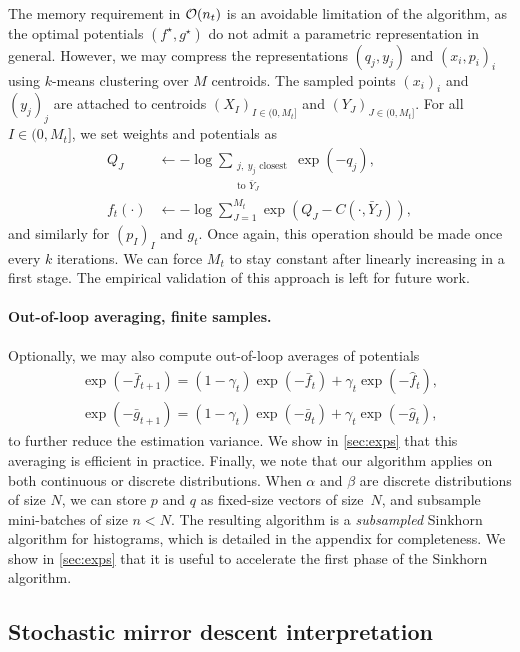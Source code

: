 The memory requirement in $\mathcal{O}(n_t)$ is an
avoidable limitation of the algorithm, as the optimal
potentials $(f^\star, g^\star)$ do not admit a parametric representation in
general. However, we may compress the representations $(q_j, y_j)$ and $(x_i,
p_i)_i$ using $k$-means clustering over $M$ centroids. The
sampled points $(x_i)_i$ and $(y_j)_j$ are attached to centroids ${(X_I)}_{I \in
(0,M_t]}$ and ${(Y_J)}_{J \in (0,M_t]}$. For all $I \in (0, M_t]$, we set
weights and potentials as
\begin{align}
    Q_J &\gets - \log \sum_{\substack{j,\:y_j \text{ closest}\\\text{to } \bar Y_J}}
     \exp(-q_j),\\
    f_t(\cdot) &\gets - \log\sum_{J=1}^{M_t} \exp(Q_J - C(\cdot, \bar Y_J)),
\end{align}
and similarly for $(p_I)_I$ and $g_t$. Once again, this operation should be made
once every $k$ iterations. We can force $M_t$ to stay constant after linearly increasing in a first stage. The empirical validation of this approach is left for future work.

\paragraph{Out-of-loop averaging, finite samples.} Optionally, we may also
compute out-of-loop averages of potentials
\begin{align}
    \exp(-\bar f_{t+1}) = (1 - \gamma_t) \exp(-\bar f_t) + \gamma_t \exp(-\hat f_t), \\
    \exp(-\bar g_{t+1}) = (1 - \gamma_t) \exp(-\bar g_t) + \gamma_t \exp(-\hat g_t),
\end{align}
to further reduce the estimation variance. We show in \autoref{sec:exps} that
this averaging is efficient in practice. Finally, we note that our algorithm
applies on both continuous or discrete distributions. When $\alpha$ and $\beta$
are discrete distributions of size $N$, we can store $p$ and $q$ as fixed-size
vectors of size~$N$, and subsample mini-batches of size $n < N$. The resulting
algorithm is a \textit{subsampled} Sinkhorn algorithm for histograms, which is
detailed in the appendix for completeness. We show in \autoref{sec:exps} that it
is useful to accelerate the first phase of the Sinkhorn algorithm.


\subsection{Stochastic mirror descent interpretation}
\label{sec-mirror}

